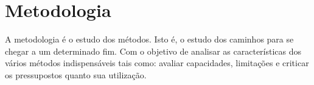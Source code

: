 \chapter{Metodologia}\label{chp:22_metodologia}

\begin{resumocapitulo}
A metodologia é o estudo dos métodos. Isto é, o estudo dos caminhos para se chegar a um determinado fim. Com o objetivo de analisar as características dos vários métodos indispensáveis tais como: avaliar capacidades, limitações e criticar os pressupostos quanto sua utilização.
\end{resumocapitulo}
